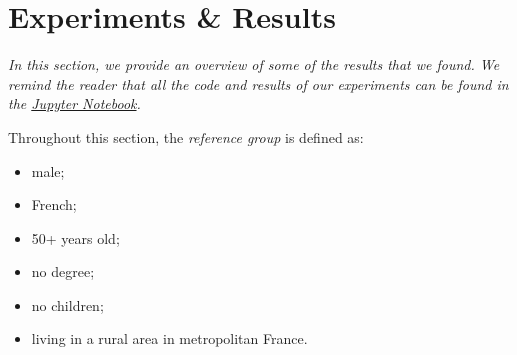 \chapter{Experiments \& Results}
\textit{In this section, we provide an overview of some of the results that we found. We remind the reader that all the code and results of our experiments can be found in the \href{https://github.com/ncocacola/econml/blob/master/econml.ipynb}{Jupyter Notebook}.}

Throughout this section, the \textit{reference group} is defined as:
\begin{itemize}
    \item male;
    \item French;
    \item 50+ years old;
    \item no degree;
    \item no children;
    \item living in a rural area in metropolitan France.
\end{itemize}



